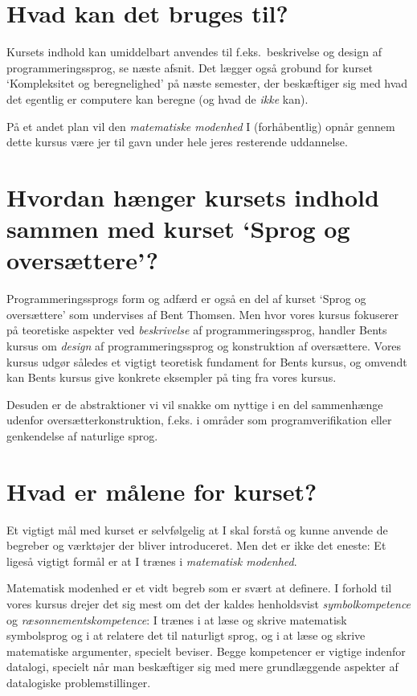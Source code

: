 \documentclass[11pt,a4paper,article,oneside]{memoir}
\begin{document}
\section{Hvad kan det bruges til?}

Kursets indhold kan umiddelbart anvendes til f.eks.\ beskrivelse og design
af programmeringssprog, se næste afsnit. Det lægger også grobund for
kurset `Kompleksitet og beregnelighed' på næste semester, der beskæftiger
sig med hvad det egentlig er computere kan beregne (og hvad de \emph{ikke}
kan).

På et andet plan vil den \emph{matematiske modenhed} I (forhåbentlig)
opnår gennem dette kursus være jer til gavn under hele jeres resterende
uddannelse.

\section{Hvordan hænger kursets indhold sammen med kurset `Sprog og
  oversættere'?}

Programmeringssprogs form og adfærd er også en del af kurset `Sprog og
oversættere' som undervises af Bent Thomsen. Men hvor vores kursus
fokuserer på teoretiske aspekter ved \emph{beskrivelse} af
programmeringssprog, handler Bents kursus om \emph{design} af
programmeringssprog og konstruktion af oversættere. Vores kursus udgør
således et vigtigt teoretisk fundament for Bents kursus, og omvendt kan
Bents kursus give konkrete eksempler på ting fra vores kursus.

Desuden er de abstraktioner vi vil snakke om nyttige i en del sammenhænge
udenfor oversætterkonstruktion, f.eks. i områder som programverifikation
eller genkendelse af naturlige sprog.

\section{Hvad er målene for kurset?}

Et vigtigt mål med kurset er selvfølgelig at I skal forstå og kunne
anvende de begreber og værktøjer der bliver introduceret. Men det er ikke
det eneste: Et ligeså vigtigt formål er at I trænes i \emph{matematisk
  modenhed}.

Matematisk modenhed er et vidt begreb som er svært at definere. I forhold
til vores kursus drejer det sig mest om det der kaldes henholdsvist
\emph{symbolkompetence} og \emph{ræsonnementskompetence}: I trænes i at
læse og skrive matematisk symbolsprog og i at relatere det til naturligt
sprog, og i at læse og skrive matematiske argumenter, specielt
beviser. Begge kompetencer er vigtige indenfor datalogi, specielt når man
beskæftiger sig med mere grundlæggende aspekter af datalogiske
problemstillinger.
\end{document}
